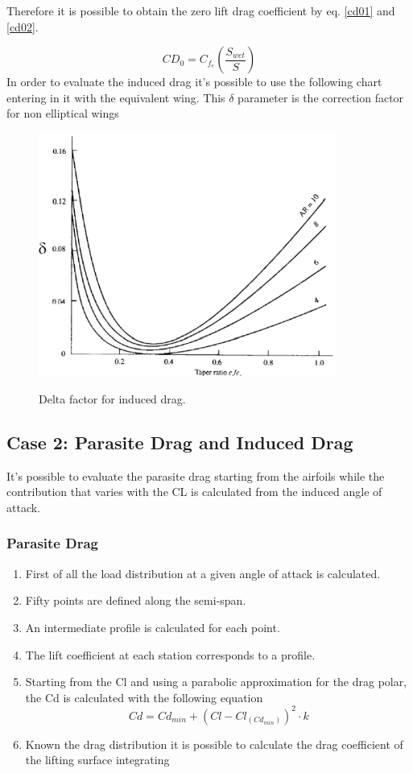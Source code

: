 Therefore it is possible to obtain the zero lift drag coefficient by eq. \ref{cd01} and \ref{cd02}.

\begin{equation}
CD_0 =  C_{f_{e}} \left( \frac{S_{wet}}{S}\right)
\end{equation}
 In order to evaluate the induced drag it's possible to use the following chart entering in it with the equivalent wing. This $\delta$ parameter is the correction factor for non elliptical wings
\begin{figure}[H]
	\centering
	{\includegraphics[height=8cm]{Immagini/deltainduceddrag}} 
	\caption{Delta factor for induced drag.}
	\label{deltadrag}
\end{figure}


\subsection{Case 2: Parasite Drag and Induced Drag}
It's possible to evaluate the parasite drag starting from the airfoils while the contribution that varies with the CL is calculated from the induced angle of attack.

\subsubsection{Parasite Drag}
\begin{enumerate}
	\item First of all the load distribution at a given angle of attack is calculated.
\item Fifty points are defined along the semi-span.
\item An intermediate profile is calculated for each point.
\item The lift coefficient at each station corresponds to a profile.
\item Starting from the Cl and using a parabolic approximation for the drag polar, the Cd is calculated with the following equation
	\begin{equation}
	Cd = Cd_{min} + (Cl - Cl_{(Cd_{min})})^2 \cdot k
	\end{equation}
	\item Known the drag distribution it is possible to calculate the drag coefficient of the lifting surface integrating
	\end{enumerate}
	
